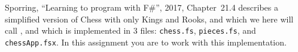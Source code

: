 Sporring, ``Learning to program with F\#'', 2017, Chapter~21.4 describes a simplified version of Chess with only Kings and Rooks, and which we here will call \chess, and which is implemented in 3 files: \lstinline{chess.fs}, \lstinline{pieces.fs}, and \lstinline{chessApp.fsx}. In this assignment you are to work with this implementation.
